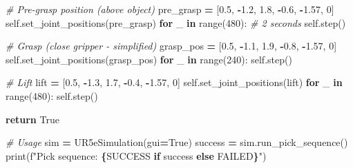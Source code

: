 \documentclass[
]{article}
\newenvironment{Shaded}{\begin{snugshade}}{\end{snugshade}}
\newcommand{\BuiltInTok}[1]{#1}
\newcommand{\CommentTok}[1]{\textcolor[rgb]{0.56,0.35,0.01}{\textit{#1}}}
\newcommand{\ControlFlowTok}[1]{\textcolor[rgb]{0.13,0.29,0.53}{\textbf{#1}}}
\newcommand{\DecValTok}[1]{\textcolor[rgb]{0.00,0.00,0.81}{#1}}
\newcommand{\FloatTok}[1]{\textcolor[rgb]{0.00,0.00,0.81}{#1}}
\newcommand{\KeywordTok}[1]{\textcolor[rgb]{0.13,0.29,0.53}{\textbf{#1}}}
\newcommand{\NormalTok}[1]{#1}
\newcommand{\OperatorTok}[1]{\textcolor[rgb]{0.81,0.36,0.00}{\textbf{#1}}}
\newcommand{\SpecialCharTok}[1]{\textcolor[rgb]{0.81,0.36,0.00}{\textbf{#1}}}
\newcommand{\SpecialStringTok}[1]{\textcolor[rgb]{0.31,0.60,0.02}{#1}}
\newcommand{\StringTok}[1]{\textcolor[rgb]{0.31,0.60,0.02}{#1}}
\newcommand{\VariableTok}[1]{\textcolor[rgb]{0.00,0.00,0.00}{#1}}
\begin{document}
\begin{Shaded}
\begin{Highlighting}[]
        \CommentTok{\# Pre{-}grasp position (above object)}
\NormalTok{        pre\_grasp }\OperatorTok{=}\NormalTok{ [}\FloatTok{0.5}\NormalTok{, }\OperatorTok{{-}}\FloatTok{1.2}\NormalTok{, }\FloatTok{1.8}\NormalTok{, }\OperatorTok{{-}}\FloatTok{0.6}\NormalTok{, }\OperatorTok{{-}}\FloatTok{1.57}\NormalTok{, }\DecValTok{0}\NormalTok{]}
        \VariableTok{self}\NormalTok{.set\_joint\_positions(pre\_grasp)}
        \ControlFlowTok{for}\NormalTok{ \_ }\KeywordTok{in} \BuiltInTok{range}\NormalTok{(}\DecValTok{480}\NormalTok{):  }\CommentTok{\# 2 seconds}
            \VariableTok{self}\NormalTok{.step()}

        \CommentTok{\# Grasp (close gripper {-} simplified)}
\NormalTok{        grasp\_pos }\OperatorTok{=}\NormalTok{ [}\FloatTok{0.5}\NormalTok{, }\OperatorTok{{-}}\FloatTok{1.1}\NormalTok{, }\FloatTok{1.9}\NormalTok{, }\OperatorTok{{-}}\FloatTok{0.8}\NormalTok{, }\OperatorTok{{-}}\FloatTok{1.57}\NormalTok{, }\DecValTok{0}\NormalTok{]}
        \VariableTok{self}\NormalTok{.set\_joint\_positions(grasp\_pos)}
        \ControlFlowTok{for}\NormalTok{ \_ }\KeywordTok{in} \BuiltInTok{range}\NormalTok{(}\DecValTok{240}\NormalTok{):}
            \VariableTok{self}\NormalTok{.step()}

        \CommentTok{\# Lift}
\NormalTok{        lift }\OperatorTok{=}\NormalTok{ [}\FloatTok{0.5}\NormalTok{, }\OperatorTok{{-}}\FloatTok{1.3}\NormalTok{, }\FloatTok{1.7}\NormalTok{, }\OperatorTok{{-}}\FloatTok{0.4}\NormalTok{, }\OperatorTok{{-}}\FloatTok{1.57}\NormalTok{, }\DecValTok{0}\NormalTok{]}
        \VariableTok{self}\NormalTok{.set\_joint\_positions(lift)}
        \ControlFlowTok{for}\NormalTok{ \_ }\KeywordTok{in} \BuiltInTok{range}\NormalTok{(}\DecValTok{480}\NormalTok{):}
            \VariableTok{self}\NormalTok{.step()}

        \ControlFlowTok{return} \VariableTok{True}

\CommentTok{\# Usage}
\NormalTok{sim }\OperatorTok{=}\NormalTok{ UR5eSimulation(gui}\OperatorTok{=}\VariableTok{True}\NormalTok{)}
\NormalTok{success }\OperatorTok{=}\NormalTok{ sim.run\_pick\_sequence()}
\BuiltInTok{print}\NormalTok{(}\SpecialStringTok{f"Pick sequence: }\SpecialCharTok{\{}\StringTok{\textquotesingle{}SUCCESS\textquotesingle{}} \ControlFlowTok{if}\NormalTok{ success }\ControlFlowTok{else} \StringTok{\textquotesingle{}FAILED\textquotesingle{}}\SpecialCharTok{\}}\SpecialStringTok{"}\NormalTok{)}
\end{Highlighting}
\end{Shaded}
\end{document}
